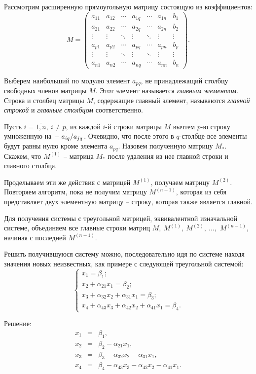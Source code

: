 
    Рассмотрим расширенную прямоугольную матрицу состоящую из коэффициентов:
    \begin{equation}
        M = \left( \begin{array}{cccccc|c}
           a_{11} & a_{12} & \cdots & a_{1 q} & \cdots & a_{1 n} & b_1 \\ 
           a_{21} & a_{22} & \cdots & a_{2 q} & \cdots & a_{2 n} & b_2 \\ 
           \vdots & \vdots & \ddots & \vdots & \ddots & \vdots & \vdots \\ 
           a_{p 1} & a_{p 2} & \cdots & a_{pq} & \cdots & a_{pn} & b_{p} \\ 
           \vdots & \vdots & \ddots & \vdots & \ddots & \vdots & \vdots \\ 
           a_{n 1} & a_{n 2} & \cdots & a_{nq} & \cdots & a_{nn} & b_{n}
       \end{array} \right).
    \label{eq:matrix_m}\end{equation} 

    Выберем наибольший по модулю элемент \( a_{pq} \), не принадлежащий столбцу свободных членов матрицы \( M \). Этот элемент называется \textit{главным элементом}. Строка и столбец матрицы \( M \), содержащие главный элемент, называются \textit{главной строкой} и \textit{главным столбцом} соответственно.

    Пусть \( i = \overline{1,n}, ~ i \neq p \), из каждой \( i \)-й строки матрицы \( M \) вычтем \( p \)-ю строку умноженную на \( - \left. a_{iq} \middle/ a_{jq} \right. \). Очевидно, что после этого в \( q \)-столбце все элементы будут равны нулю кроме элемента \( a_{pq} \). Назовем полученную матрицу \( M_* \). Скажем, что \( M^{(1)} \) -- матрица \( M_* \) после удаления из нее главной строки и главного столбца.

    Проделываем эти же действия с матрицей \( M^{(1)} \), получаем матрицу \( M^{(2)} \). Повторяем алгоритм, пока не получим матрицу \( M^{(n - 1)} \), которая из себя представляет двух элементную матрицу -- строку, которая также является главной.

    Для получения системы с треугольной матрицей, эквивалентной изначальной системе, объединяем все главные строки матриц \( M, ~ M^{(1)}, ~ M^{(2)}, ~ \dots,\) \( M^{(n - 1)} \), начиная с последней \( M^{(n - 1)} \).

    Решить получившуюся систему можно, последовательно идя по системе находя значения новых неизвестных, как примере с следующей треугольной системой:
    \[
        \begin{cases}
            x_1 = \beta_1; \\ 
            x_2 + \alpha_{21} x_1 = \beta_2; \\ 
            x_3 + \alpha_{32} x_2 + \alpha_{31} x_1 = \beta_3; \\ 
            x_4 + \alpha_{43} x_3 + \alpha_{42} x_2 + \alpha_{41} x_1 = \beta_4.
        \end{cases}
    \] 

    Решение:
    \[ \begin{matrix}
        x_1 & = & \beta_1, \\ 
        x_2 & = & \beta_2 - \alpha_{21} x_1, \\ 
        x_3 & = & \beta_3 - \alpha_{32} x_2 - \alpha_{31} x_1, \\ 
        x_4 & = & \beta_4 - \alpha_{43} x_3 - \alpha_{42} x_2 - \alpha_{41} x_1.
    \end{matrix} \]
